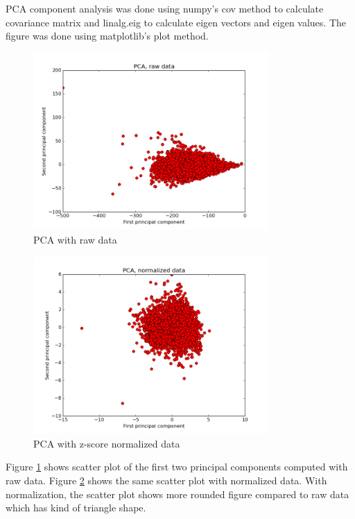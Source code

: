 \documentclass[12pt]{article}
\begin{document}
PCA component analysis was done using numpy's cov method to calculate covariance matrix and linalg.eig to calculate eigen vectors and eigen values. The figure was done using matplotlib's plot method.

\begin{figure}[H]
    \centering
    \includegraphics[width=0.8\textwidth]{pca_raw}
    \caption{PCA with raw data}
    \label{fig:pca_raw}
\end{figure}

\begin{figure}[H]
    \centering
    \includegraphics[width=0.8\textwidth]{pca_normalized}
    \caption{PCA with z-score normalized data}
    \label{fig:pca_normalized}
\end{figure}

Figure \ref{fig:pca_raw} shows scatter plot of the first two principal components computed with raw data. Figure \ref{fig:pca_normalized} shows the same scatter plot with normalized data. With normalization, the scatter plot shows more rounded figure compared to raw data which has kind of triangle shape.
\end{document}
